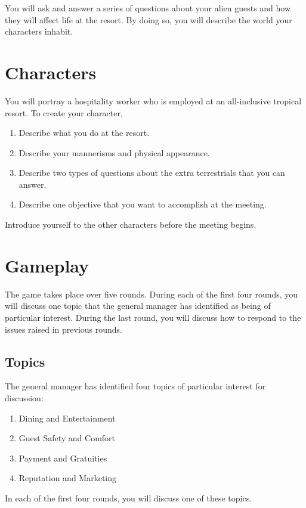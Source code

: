 \documentclass[a6paper, 11pt, parskip=half, DIV=15]{scrartcl}
\begin{document}
\vfill

You will ask and answer a series of questions about your alien guests and how they will affect life at the resort. By doing so, you will describe the world your characters inhabit.%


\newpage
\enlargethispage{1.75\baselineskip}

\section*{Characters}
You will portray a hospitality worker who is employed at an all-inclusive tropical resort. To create your character,
\begin{enumerate}[nosep]
	\item Describe what you do at the resort.
	\item Describe your mannerisms and physical appearance.
	\item Describe two types of questions about the extra terrestrials that you can answer.
	\item Describe one objective that you want to accomplish at the meeting.
\end{enumerate}
Introduce yourself to the other characters before the meeting begins.

\section*{Gameplay}
The game takes place over five rounds. 
During each of the first four rounds, you will discuss one topic that the general manager has identified as being of particular interest.
During the last round, you will discuss how to respond to the issues raised in previous rounds. 

\newpage
\enlargethispage{1.75\baselineskip}

\subsection*{Topics}
The general manager has identified four topics of particular interest for discussion:
\begin{enumerate}[nosep]
	\item Dining and Entertainment
	\item Guest Safety and Comfort
	\item Payment and Gratuities
	\item Reputation and Marketing
\end{enumerate}
In each of the first four rounds, you will discuss one of these topics.
\end{document}
